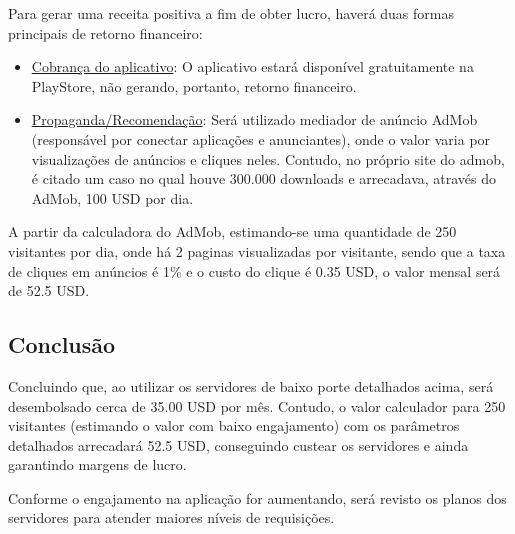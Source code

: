 Para gerar uma receita positiva a fim de obter lucro, haverá duas formas principais de retorno financeiro:

\begin{itemize}
	\item \underline{Cobrança do aplicativo}: O aplicativo estará disponível gratuitamente na PlayStore, não gerando, portanto, retorno financeiro.
	\item \underline{Propaganda/Recomendação}: Será utilizado mediador de anúncio AdMob (responsável por conectar aplicações e anunciantes), onde o valor varia por visualizações de anúncios e cliques neles. Contudo, no próprio site do admob, é citado um caso no qual houve 300.000 downloads e arrecadava, através do AdMob, 100 USD por dia. \cite{GoogleAdMob}
\end{itemize}

A partir da calculadora do AdMob, estimando-se uma quantidade de 250 visitantes por dia, onde há 2 paginas visualizadas por visitante, sendo que a taxa de cliques em anúncios é 1\% e o custo do clique é 0.35 USD, o valor mensal será de 52.5 USD.

\subsection{Conclusão}

Concluindo que, ao utilizar os servidores de baixo porte detalhados acima, será desembolsado cerca de 35.00 USD por mês. Contudo, o valor calculador para 250 visitantes (estimando o valor com baixo engajamento) com os parâmetros detalhados arrecadará 52.5 USD, conseguindo custear os servidores e ainda garantindo margens de lucro.

Conforme o engajamento na aplicação for aumentando, será revisto os planos dos servidores para atender maiores níveis de requisições.

